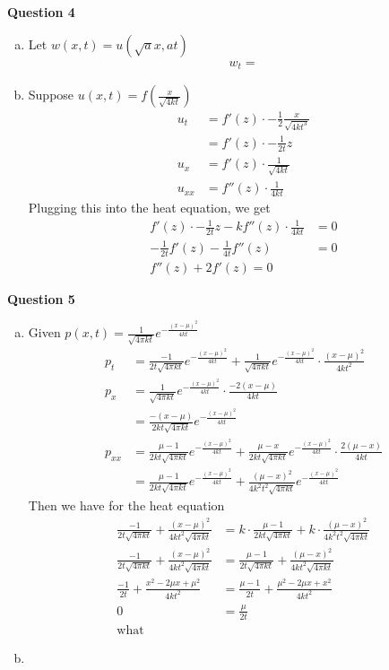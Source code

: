 \documentclass[12pt, letterpaper]{article}
\begin{document}
\noindent \textbf{Question 4} 
\begin{enumerate}[(a)]
    \item Let $w(x,t) = u(\sqrt a x, at)$
    \begin{align*}
        w_t = 
    \end{align*}
    \item Suppose $u(x,t) = f(\frac{x}{\sqrt{4kt}})$ 
    \begin{align*}
        u_t &= f'(z) \cdot -\frac 12 \frac{x}{\sqrt{4kt^3}} \\
        &= f'(z) \cdot -\frac{1}{2t} z \\
        u_x &= f'(z) \cdot \frac{1}{\sqrt{4kt}} \\
        u_{xx} &= f''(z) \cdot \frac{1}{4kt} 
    \end{align*}
    Plugging this into the heat equation, we get
    \begin{align*}
        f'(z) \cdot -\frac{1}{2t} z - k f''(z) \cdot \frac{1}{4kt} &=0 \\
        -\frac{1}{2t}f'(z) - \frac{1}{4t}f''(z) &= 0 \\
        f''(z) + 2f'(z) = 0
    \end{align*}
\end{enumerate}
\newpage
\noindent \textbf{Question 5} 
\begin{enumerate}[(a)]
    \item Given $p(x,t) = \frac{1}{\sqrt{4\pi kt}} e^{-\frac{(x-\mu)^2}{4kt}}$
    \begin{align*}
        p_t &= \frac{-1}{2t\sqrt{4\pi kt}} e^{-\frac{(x-\mu)^2}{4kt}} + \frac{1}{\sqrt{4\pi kt}} e^{-\frac{(x-\mu)^2}{4kt}}\cdot \frac{(x-\mu)^2}{4kt^2} \\
        p_x &= \frac{1}{\sqrt{4\pi kt}} e^{-\frac{(x-\mu)^2}{4kt}} \cdot \frac{-2(x-\mu)}{4kt} \\
        &= \frac{-(x-\mu)}{2kt\sqrt{4\pi kt}}e^{-\frac{(x-\mu)^2}{4kt}}\\
        p_{xx} &= \frac{\mu-1}{2kt\sqrt{4\pi kt}}e^{-\frac{(x-\mu)^2}{4kt}} + \frac{\mu-x}{2kt\sqrt{4\pi kt}}e^{-\frac{(x-\mu)^2}{4kt}} \cdot \frac{2(\mu-x)}{4kt} \\
        &= \frac{\mu-1}{2kt\sqrt{4\pi kt}}e^{-\frac{(x-\mu)^2}{4kt}} + \frac{(\mu-x)^2}{4k^2t^2\sqrt{4\pi kt}}e^{-\frac{(x-\mu)^2}{4kt}}
    \end{align*}
    Then we have for the heat equation
    \begin{align*}
        \frac{-1}{2t\sqrt{4\pi kt}} + \frac{(x-\mu)^2}{4kt^2\sqrt{4\pi kt}} &= k\cdot \frac{\mu-1}{2kt\sqrt{4\pi kt}} + k\cdot \frac{(\mu-x)^2}{4k^2t^2\sqrt{4\pi kt}} \\
        \frac{-1}{2t\sqrt{4\pi kt}} + \frac{(x-\mu)^2}{4kt^2\sqrt{4\pi kt}} &= \frac{\mu-1}{2t\sqrt{4\pi kt}} + \frac{(\mu-x)^2}{4kt^2\sqrt{4\pi kt}} \\
        \frac{-1}{2t} + \frac{x^2-2\mu x + \mu^2}{4kt^2} &= \frac{\mu-1}{2t} + \frac{\mu^2 -2\mu x + x^2}{4kt^2} \\
        0 &= \frac{\mu}{2t} \\
        \text{what}
    \end{align*}
    \item
\end{enumerate}
\end{document}

